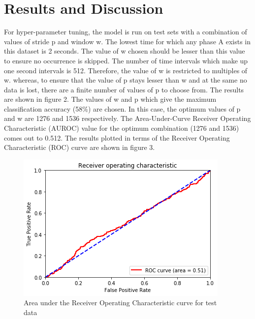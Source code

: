 \documentclass{article}
\begin{document}
\section{Results and Discussion}
For hyper-parameter tuning, the model is run on test sets with a combination of values of stride p and window w. The lowest time for which any phase A exists in this dataset is 2 seconds. The value of w chosen should be lesser than this value to ensure no occurrence is skipped. The number of time intervals which make up one second intervals is 512. Therefore, the value of w is restricted to multiples of w. whereas, to ensure that the value of p stays lesser than w and at the same no data is lost, there are a finite number of values of p to choose from. The results are shown in figure 2. The values of w and p which give the maximum classification accuracy (58\%) are chosen. In this case, the optimum values of p and w are 1276 and 1536 respectively.
The Area-Under-Curve Receiver Operating Characteristic (AUROC) value for the optimum combination (1276 and 1536) comes out to 0.512.
The results plotted in terms of the Receiver Operating Characteristic (ROC) curve are shown in figure 3.



\begin{figure}[!t]
\begin{center}
\centerline{\includegraphics[width=\columnwidth]{ROC}}
	\caption{{\leg Area under the Receiver Operating Characteristic curve for test data}}
\label{fig:goal-driven-1}
\end{center}
\vskip -0.2in
\end{figure}
\end{document}
